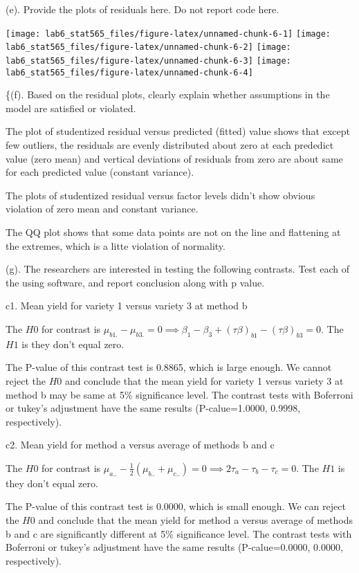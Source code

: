 \documentclass[]{article}
\begin{document}
(e).
\textcolor[rgb]{0.5,0.5,0.5}{Provide the plots of residuals here. Do not report code here.}

\texttt{[image: lab6\_stat565\_files/figure-latex/unnamed-chunk-6-1]}
\texttt{[image: lab6\_stat565\_files/figure-latex/unnamed-chunk-6-2]}
\texttt{[image: lab6\_stat565\_files/figure-latex/unnamed-chunk-6-3]}
\texttt{[image: lab6\_stat565\_files/figure-latex/unnamed-chunk-6-4]}

\{(f).
\textcolor[rgb]{0.5,0.5,0.5}{Based on the residual plots, clearly explain whether assumptions in the model are satisfied or violated.}

The plot of studentized residual versus predicted (fitted) value shows
that except few outliers, the residuals are evenly distributed about
zero at each prededict value (zero mean) and vertical deviations of
residuals from zero are about same for each predicted value (constant
variance).

The plots of studentized residual versus factor levels didn't show
obvious violation of zero mean and constant variance.

The QQ plot shows that some data points are not on the line and
flattening at the extremes, which is a litte violation of normality.

(g).
\textcolor[rgb]{0.5,0.5,0.5}{The researchers are interested in testing the following contrasts. Test each of the using software, and report conclusion along with p value.}

c1. Mean yield for variety 1 versus variety 3 at method b

The \(H0\) for contrast is
\(\mu_{b1.}-\mu_{b3.}=0\implies\beta_{1}-\beta_{3}+(\tau\beta)_{b1}-(\tau\beta)_{b3}=0\).
The \(H1\) is they don't equal zero.

The P-value of this contrast test is 0.8865, which is large enough. We
cannot reject the \(H0\) and conclude that the mean yield for variety 1
versus variety 3 at method b may be same at 5\% significance level. The
contrast tests with Boferroni or tukey's adjustment have the same
results (P-calue=1.0000, 0.9998, respectively).

c2. Mean yield for method a versus average of methods b and c

The \(H0\) for contrast is
\(\mu_{a..}-\frac12(\mu_{b..}+\mu_{c..})=0\implies2\tau_a-\tau_b-\tau_c=0\).
The \(H1\) is they don't equal zero.

The P-value of this contrast test is 0.0000, which is small enough. We
can reject the \(H0\) and conclude that the mean yield for method a
versus average of methods b and c are significantly different at 5\%
significance level. The contrast tests with Boferroni or tukey's
adjustment have the same results (P-calue=0.0000, 0.0000, respectively).
\end{document}
